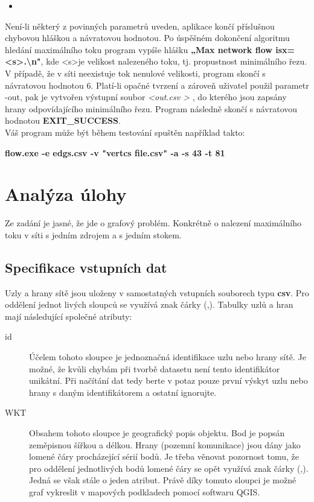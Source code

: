 \documentclass[12pt,a4paper]{article}
\begin{document}
	\begin{itemize}
	\item[]
	\end{itemize}
	
	Není-li některý z povinných parametrů uveden, aplikace končí příslušnou chybovou hláškou a návratovou hodnotou. Po úspěšném dokončení algoritmu hledání maximálního toku program vypíše hlášku \textbf{„Max network flow is\textbar x\textbar =\textless s\textgreater .\textbackslash n"}, kde \textless s\textgreater je velikost nalezeného toku, tj. propustnost minimálního řezu. V případě, že v síti neexistuje tok nenulové velikosti, program skončí s návratovou hodnotou 6. Platí-li opačné tvrzení a zároveň uživatel použil parametr -out, pak je vytvořen výstupní soubor \textit{\textless out.csv \textgreater} , do kterého jsou zapsány hrany odpovídajícího minimálního řezu. Program následně skončí s návratovou hodnotou \textbf{EXIT\_SUCCESS}. \\[\baselineskip]
	Váš program může být během testování spuštěn například takto:
	\\[\baselineskip]
	\centerline{\textbf{flow.exe -e edgs.csv -v "vertcs file.csv" -a -s 43 -t 81}}
	\newpage
	\section{Analýza úlohy}
	Ze zadání je jasné, že jde o grafový problém. Konkrétně o nalezení maximálního toku v síti s jedním zdrojem a s jedním stokem.
	\bigskip
	\subsection{Specifikace vstupních dat}
	Uzly a hrany sítě jsou uloženy v samostatných vstupních souborech typu \textbf{csv}. Pro oddělení jednot livých sloupců se využívá znak čárky (,). Tabulky uzlů a hran mají následující společné atributy: \bigskip
	\begin{description}
	\item[id] Účelem tohoto sloupce je jednoznačná identifikace uzlu nebo hrany sítě. Je možné, že kvůli chybám při tvorbě datasetu není tento identifikátor unikátní. Při načítání dat tedy berte v potaz pouze první výskyt uzlu nebo hrany s daným identifikátorem a ostatní ignorujte.
	\item[WKT] Obsahem tohoto sloupce je geografický popis objektu. Bod je popsán zeměpisnou šířkou a délkou. Hrany (pozemní komunikace) jsou dány jako lomené čáry procházející sérií bodů. Je třeba věnovat pozornost tomu, že pro oddělení jednotlivých bodů lomené čáry se opět využívá znak čárky (,). Jedná se však stále o jeden atribut. Právě díky tomuto sloupci je možné graf vykreslit v mapových podkladech pomocí softwaru QGIS.
	\end{description}
	
\end{document}
